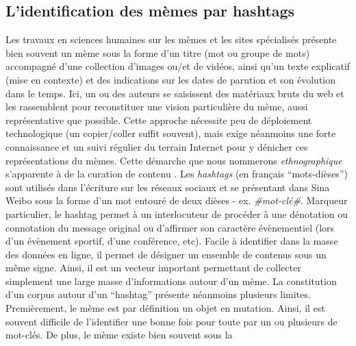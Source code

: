 \subsection[ L{\textquoteright}identification des m\`emes par hashtags ]{L{\textquoteright}identification des m\`emes par hashtags }
Les travaux en sciences humaines sur les m\`emes \cite{Bauckhage2011,
Coscia2013, Knobel2007} et les sites sp\'ecialis\'es \cite{Buchel2012, Bernstein2011} pr\'esente bien souvent un m\`eme sous la forme
d{\textquoteright}un titre (mot ou groupe de mots) accompagn\'e
d{\textquoteright}une collection d{\textquoteright}images ou/et de
vid\'eos, ainsi qu{\textquoteright}un texte explicatif (mise en
contexte) et des indications sur les dates de parution et son
\'evolution dans le temps. Ici, un ou des auteurs se saisissent des
mat\'eriaux bruts du web et les rassemblent pour reconstituer une
vision particuli\`ere du m\`eme, aussi repr\'esentative que possible.
Cette approche n\'ecessite peu de d\'eploiement technologique (un
copier/coller suffit souvent), mais exige n\'eanmoins une forte
connaissance et un suivi r\'egulier du terrain Internet pour y
d\'enicher ces repr\'esentations du m\`emes. Cette d\'emarche que nous
nommerons \textit{ethnographique }s{\textquoteright}apparente \`a de la
curation de contenu \cite{Buckingham2006}. Les \textit{hashtags }(en
fran\c{c}ais {\textquotedblleft}mots-di\`eses{\textquotedblright}) sont
utilis\'es dans l{\textquoteright}\'ecriture sur les r\'eseaux sociaux
et se pr\'esentant dans Sina Weibo sous la forme d{\textquoteright}un
mot entour\'e de deux di\`eses - ex. \textit{\#mot-cl\'e\#}. Marqueur
particulier, le hashtag permet \`a un interlocuteur de proc\'eder \`a
une d\'enotation ou connotation du message original \cite{Romero2011} ou
d{\textquoteright}affirmer son caract\`ere \'ev\`enementiel (lors
d{\textquoteright}un \'ev\`enement sportif, d{\textquoteright}une
conf\'erence, etc). Facile \`a identifier dans la masse des donn\'ees
en ligne, il permet de d\'esigner un ensemble de contenus sous un
m\^eme signe. Ainsi, il est un vecteur important permettant de
collecter simplement une large masse d{\textquoteright}informations
autour d{\textquoteright}un m\`eme. La constitution
d{\textquoteright}un corpus autour d{\textquoteright}un
{\textquotedblleft}hashtag{\textquotedblright} pr\'esente n\'eanmoins
plusieurs limites. Premi\`erement, le m\`eme est par d\'efinition un
objet en mutation. Ainsi, il est souvent difficile de
l{\textquoteright}identifier une bonne fois pour toute par un ou
plusieurs de mot-cl\'es. De plus, le m\`eme existe bien souvent sous la
